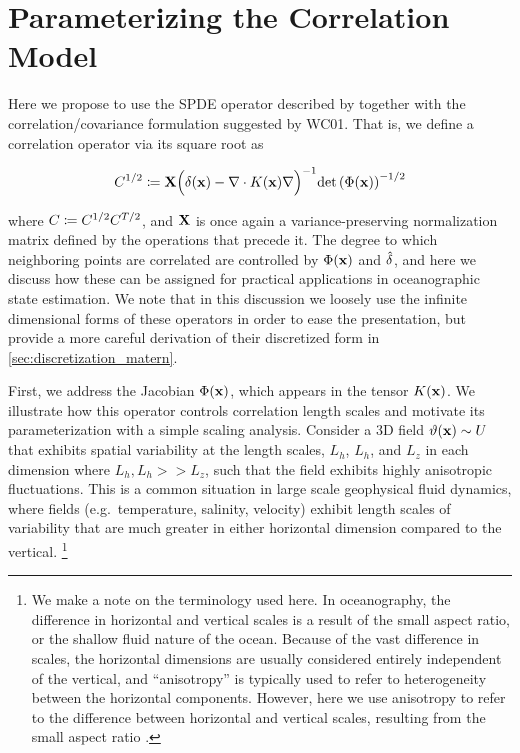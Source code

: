 \section{Parameterizing the Correlation Model}
\label{sec:matern_operator}

Here we propose to use the SPDE operator described by \citet{RSSB:RSSB777}
together with the correlation/covariance formulation suggested by WC01.
That is, we define a correlation operator via its square root as
\begin{linenomath*}\begin{equation}
    C^{1/2} \coloneqq \mathbf{X}
    \Big(\delta(\mathbf{x})- \nabla\cdot K(\mathbf{x})\nabla\Big)^{-1}
    \text{det}\left(\Phi(\mathbf{x})\right)^{-1/2}
\end{equation}\end{linenomath*}
where $C \coloneqq C^{1/2}C^{T/2}$, and $\mathbf{X}$ is
once again a variance-preserving normalization matrix defined by the operations
that precede it.
The degree to which neighboring points are correlated are controlled by
$\Phi(\mathbf{x})$ and $\hat{\delta}$, and here we discuss how these can be assigned for
practical applications in oceanographic state estimation.
We note that in this discussion we loosely use the infinite dimensional forms of
these operators in order to ease the presentation, but provide a more careful
derivation of their discretized form in \cref{sec:discretization_matern}.

First, we address the Jacobian $\Phi(\mathbf{x})$, which appears in the tensor
$K(\mathbf{x})$.
We illustrate how this operator controls correlation length scales and
motivate its parameterization with a simple scaling analysis.
Consider a 3D field $\vartheta(\mathbf{x})\sim U$ that exhibits spatial variability at the
length scales, $L_h$, $L_h$, and $L_z$ in each dimension
where $L_h, L_h >> L_z$, such that the field exhibits highly
anisotropic fluctuations.
This is a common situation in large scale geophysical fluid
dynamics, where fields (e.g.\ temperature, salinity, velocity) exhibit length scales of
variability that are much greater in either horizontal dimension compared to the
vertical.
\footnote{
    We make a note on the terminology used here.
    In oceanography, the difference in horizontal and vertical scales
    is a result of the small aspect ratio, or the shallow fluid nature of the ocean.
    Because of the vast difference in scales, the horizontal dimensions are usually
    considered entirely independent of the vertical, and ``anisotropy'' is typically
    used to refer to heterogeneity between the horizontal components.
    However, here we use anisotropy to refer to the difference between horizontal
    and vertical scales, resulting from the small aspect ratio \citep{vallis2006}.
}

